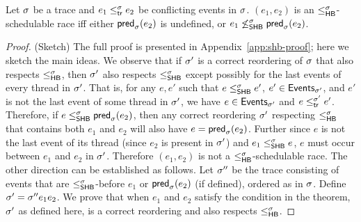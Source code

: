\begin{theorem}%
\label{thm:SHBSoundness}
Let $\sigma$ be a trace and $e_1 \leq^{\sigma}_{\mathsf{tr}} e_2$ be conflicting events in $\sigma$.
$(e_1, e_2)$ is an $\leq^{\sigma}_{\mathsf{HB}}$-schedulable race iff 
either $\mathsf{pred}_{\sigma}(e_2)$ is undefined, or $e_1 \not\leq^\sigma_{\mathsf{SHB}} \mathsf{pred}_{\sigma}(e_2)$.
\end{theorem}

\begin{proof}(Sketch)
The full proof is presented in Appendix~\ref{app:shb-proof}; here we
sketch the main ideas.  We observe that if $\sigma'$ is a correct
reordering of $\sigma$ that also respects $\leq^{\sigma}_{\mathsf{HB}}$, then $\sigma'$ also
respects $\leq^{\sigma}_{\mathsf{SHB}}$ except possibly for the last events of every
thread in $\sigma'$. That is, for any $e,e'$ such that $e \leq^{\sigma}_{\mathsf{SHB}} e'$,
$e' \in \mathsf{Events}_{\sigma'}$, and $e'$ is not the last event of some thread
in $\sigma'$, we have $e \in \mathsf{Events}_{\sigma'}$ and $e \leq^{\sigma'}_{\mathsf{tr}}
e'$. Therefore, if $e \leq^{\sigma}_{\mathsf{SHB}} \mathsf{pred}_{\sigma}(e_2)$, then any correct
reordering $\sigma'$ respecting $\leq^{\sigma}_{\mathsf{HB}}$ that contains both $e_1$ and
$e_2$ will also have $e = \mathsf{pred}_{\sigma}(e_2)$. Further since $e$ is not
the last event of its thread (since $e_2$ is present in $\sigma'$) and
$e_1 \leq^{\sigma}_{\mathsf{SHB}} e$, $e$ must occur between $e_1$ and $e_2$ in
$\sigma'$. Therefore $(e_1,e_2)$ is not a $\leq^{\sigma}_{\mathsf{HB}}$-schedulable race.
The other direction can be established as follows. Let $\sigma''$ be the
trace consisting of events that are $\leq^{\sigma}_{\mathsf{SHB}}$-before $e_1$ or
$\mathsf{pred}_{\sigma}(e_2)$ (if defined), ordered as in $\sigma$. Define
$\sigma'= \sigma''e_1e_2$.  We prove that when $e_1$ and $e_2$ satisfy the
condition in the theorem, $\sigma'$ as defined here, is a correct
reordering and also respects $\leq^{\sigma}_{\mathsf{HB}}$.
\end{proof}

